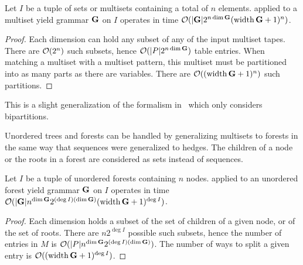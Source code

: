 



\begin{theorem}\label{thm:adp:gram-sets-complex}
    Let \(I\) be a tuple of sets or multisets containing a total of \(n\) elements.
     applied to a multiset yield grammar \(\gram\) on \(I\) operates in time \(\bigo(|\gram|2^{n\dim\gram}(\width\gram + 1)^n)\).
\end{theorem}
\begin{proof}
    Each dimension can hold any subset of any of the input multiset tapes.
    There are \(\bigo(2^n)\) such subsets, hence \(\bigo(|P|2^{n\dim\gram})\) table entries.
    When matching a multiset with a multiset pattern, this multiset must be partitioned into as many parts as there are variables.
    There are \(\bigo((\width\gram + 1)^n)\) such partitions.
\end{proof}

This is a slight generalization of the formalism in~\textcite{Siederdissen2015AlgebraicDynamicProgramming} which only considers bipartitions.

Unordered trees and forests can be handled by generalizing multisets to forests in the same way that sequences were generalized to hedges.
The children of a node or the roots in a forest are considered as sets instead of sequences.

\begin{theorem}\label{thm:adp:gram-forest-complex}
    Let \(I\) be a tuple of unordered forests containing \(n\) nodes.
     applied to an unordered forest yield grammar \(\gram\) on \(I\) operates in time
    \(\bigo(|\gram|n^{\dim\gram}2^{(\deg I)(\dim\gram)}(\width\gram + 1)^{\deg I})\).
\end{theorem}
\begin{proof}
    Each dimension holds a subset of the set of children of a given node, or of the set of roots.
    There are \(n2^{\deg I}\) possible such subsets, hence the number of entries in \(M\) is \(\bigo(|P|n^{\dim\gram}2^{(\deg I)(\dim\gram)})\).
    The number of ways to split a given entry is \(\bigo((\width\gram + 1)^{\deg I})\).
\end{proof}

